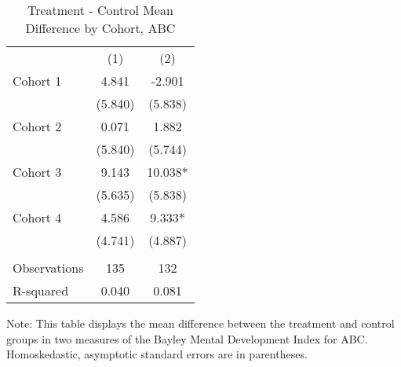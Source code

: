 \begin{table}[H] 
\begin{threeparttable}
\caption{Treatment - Control Mean Difference by Cohort, ABC}
\label{table:cohorts}
\centering 
\begin{tabular}{lcc} \toprule
 & (1) & (2) \\
Cohort 1 & 4.841 & -2.901 \\
 & (5.840) & (5.838) \\
Cohort 2 & 0.071 & 1.882 \\
 & (5.840) & (5.744) \\
Cohort 3 & 9.143 & 10.038* \\
 & (5.635) & (5.838) \\
Cohort 4 & 4.586 & 9.333* \\
 & (4.741) & (4.887) \\
 &  &  \\
Observations & 135 & 132 \\
 R-squared & 0.040 & 0.081 \\ \hline
 \end{tabular}
\begin{tablenotes}
\footnotesize
\item Note: This table displays the mean difference between the treatment and control groups in two measures of the Bayley Mental Development Index for ABC. Homoskedastic, asymptotic standard errors are in parentheses.
\end{tablenotes}
\end{threeparttable}
\end{table}
